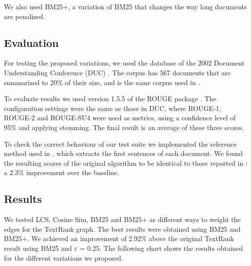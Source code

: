 \documentclass{llncs}
\begin{document}
We also used BM25+, a variation of BM25 that changes the way long documents are penalized.


\subsection{Evaluation}
For testing the proposed variations, we used the database of the 2002 Document Understanding Conference (DUC) \cite{duc2002-guidelines}. The corpus has 567 documents that are summarized to 20\% of their size, and is the same corpus used in \cite{mihalcea-tarau}. 

To evaluate results we used version 1.5.5 of the ROUGE package \cite{Lin2004a}. The configuration settings were the same as those in DUC, where ROUGE-1, ROUGE-2 and ROUGE-SU4 were used as metrics, using a confidence level of 95\% and applying stemming. The final result is an average of these three scores.

To check the correct behaviour of our test suite we implemented the reference method used in \cite{mihalcea-tarau}, which extracts the first sentences of each document. We found the resulting scores of the original algorithm to be identical to those reported in \cite{mihalcea-tarau}: a 2.3\% improvement over the baseline.


\subsection{Results}
We tested LCS, Cosine Sim, BM25 and BM25+ as different ways to weight the edges for the TextRank graph. 
The best results were obtained using BM25 and BM25+. We achieved an improvement of 2.92\% above the original TextRank result using BM25 and $\varepsilon$ = 0.25. The following chart shows the results obtained for the different variations we proposed.
\end{document}
